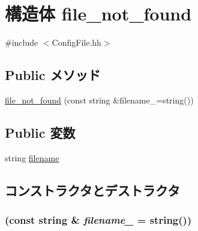 \hypertarget{structConfigFile_1_1file__not__found}{
\section{構造体 file\_\-not\_\-found}
\label{structConfigFile_1_1file__not__found}
}


{\ttfamily \#include $<$ConfigFile.hh$>$}\subsection*{Public メソッド}
\begin{DoxyCompactItemize}
\item 
\hyperlink{structConfigFile_1_1file__not__found_a2d7a5700c168258beded9d67be4c22fa}{file\_\-not\_\-found} (const string \&filename\_\-=string())
\end{DoxyCompactItemize}
\subsection*{Public 変数}
\begin{DoxyCompactItemize}
\item 
string \hyperlink{structConfigFile_1_1file__not__found_a3a1a90139c2c8ab1fca0ea8b1790b7b2}{filename}
\end{DoxyCompactItemize}


\subsection{コンストラクタとデストラクタ}
\hypertarget{structConfigFile_1_1file__not__found_a2d7a5700c168258beded9d67be4c22fa}{
\subsubsection[{file\_\-not\_\-found}]{ (const string \& {\em filename\_\-} = {\ttfamily string()})}}
\label{structConfigFile_1_1file__not__found_a2d7a5700c168258beded9d67be4c22fa}



\begin{DoxyCode}
110                         : filename(filename_) {} };
\end{DoxyCode}


